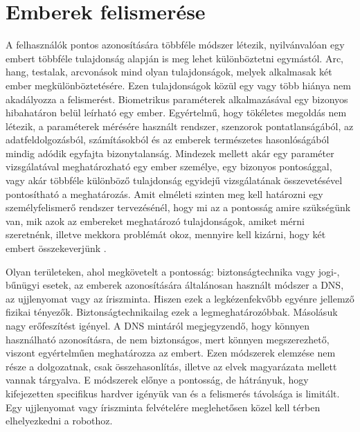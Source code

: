 \section{Emberek felismerése}
A felhasználók pontos azonosítására többféle módszer létezik, nyilvánvalóan egy embert többféle tulajdonság alapján is meg lehet különböztetni egymástól. Arc, hang, testalak, arcvonások mind olyan tulajdonságok, melyek alkalmasak két ember megkülönböztetésére. Ezen tulajdonságok közül egy vagy több hiánya nem akadályozza a felismerést. Biometrikus paraméterek alkalmazásával egy bizonyos hibahatáron belül leírható egy ember. Egyértelmű, hogy tökéletes megoldás nem létezik, a paraméterek mérésére használt rendszer, szenzorok pontatlanságából, az adatfeldolgozásból, számításokból és az emberek természetes hasonlóságából mindig adódik egyfajta bizonytalanság. Mindezek mellett akár egy paraméter vizsgálatával meghatározható egy ember személye, egy bizonyos pontosággal, vagy akár többféle különböző tulajdonság egyidejű vizsgálatának összevetésével pontosítható a meghatározás. Amit elméleti szinten meg kell határozni egy személyfelismerő rendszer tervezésénél, hogy mi az a pontosság amire szükségünk van, mik azok az embereket meghatározó tulajdonságok, amiket mérni szeretnénk, illetve mekkora problémát okoz, mennyire kell kizárni, hogy két embert összekeverjünk \cite{artc07}.

Olyan területeken, ahol megkövetelt a pontosság: biztonságtechnika vagy jogi-, bűnügyi esetek, az emberek azonosítására általánosan használt módszer a DNS, az ujjlenyomat vagy az íriszminta\cite{1597098}. Hiszen ezek a legkézenfekvőbb egyénre jellemző fizikai tényezők. Biztonságtechnikailag ezek a legmeghatározóbbak. Másolásuk nagy erőfeszítést igényel. A DNS mintáról megjegyzendő, hogy könnyen használható azonosításra, de nem biztonságos, mert könnyen megszerezhető, viszont egyértelműen meghatározza az embert. Ezen módszerek elemzése nem része a dolgozatnak, csak összehasonlítás, illetve az elvek magyarázata mellett vannak tárgyalva. E módszerek előnye a pontosság, de hátrányuk, hogy kifejezetten specifikus hardver igényük van és a felismerés távolsága is limitált. Egy ujjlenyomat vagy íriszminta felvételére meglehetősen közel kell térben elhelyezkedni a robothoz\cite{artc07}.

